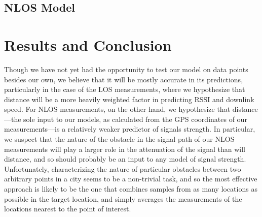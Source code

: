 \documentclass[12pt]{article}
\begin{document}

\subsection{NLOS Model}

\section{Results and Conclusion}
Though we have not yet had the opportunity to test our model on data points
besides our own, we believe that it will be mostly accurate in its predictions,
particularly in the case of the LOS measurements, where we hypothesize that
distance will be a more heavily weighted factor in predicting RSSI and downlink
speed.
For NLOS measurements, on the other hand, we hypothesize that distance---the
sole input to our models, as calculated from the GPS coordinates of our
measurements---is a relatively weaker predictor of signals strength. In
particular, we suspect that the nature of the obstacle in the signal path of our
NLOS measurements will play a larger role in the attenuation of the signal than
will distance, and so should probably be an input to any model of signal
strength. Unfortunately, characterizing the nature of particular obstacles
between two arbitrary points in a city seems to be a non-trivial task, and so
the most effective approach is likely to be the one that combines samples from
as many locations as possible in the target location, and simply averages the
measurements of the locations nearest to the point of interest.

%
%
\end{document}
